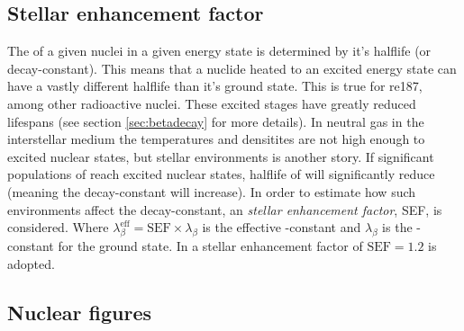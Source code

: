 \subsection{Stellar enhancement factor} \label{sec:sef}
The \betadecay of a given nuclei in a given energy state is determined by it's halflife (or decay-constant).
This means that a nuclide heated to an excited energy state can have a vastly different halflife than  it's ground state.
This is true for re{187}, among other radioactive nuclei.
These excited stages have greatly reduced lifespans (see section \ref{sec:betadecay} for more details).
In neutral gas in the interstellar medium the temperatures and densitites are not high enough to excited nuclear states, but stellar environments is another story.
If significant populations of  reach excited nuclear states, halflife of  will significantly reduce (meaning the decay-constant will increase).
In order to estimate how such environments affect the decay-constant, an \textit{stellar enhancement factor}, SEF, is considered. Where $\lambda_{\scriptscriptstyle \beta}^{\scriptscriptstyle \textrm{eff}} = \textrm{SEF}\times\lambda_{\scriptscriptstyle \beta}$ is the effective \betadecay-constant and $\lambda_{\scriptscriptstyle \beta}$ is the \betadecay-constant for the ground state.
In  a stellar enhancement factor of $\textrm{SEF}=1.2$ is adopted.

\subsection{Nuclear figures}

\begin{figure}
  \begin{minipage}{0.49\textwidth}
    
  \end{minipage}
  \begin{minipage}{0.49\textwidth}
    
    
  \end{minipage}
\end{figure}

\FloatBarrier
